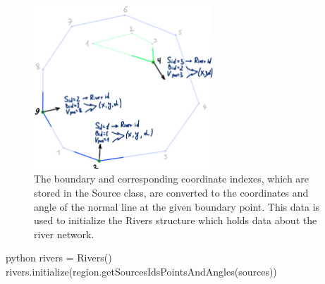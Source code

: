 \documentclass[]{pracamgr}
\begin{document}
      \begin{figure}[H]
        \centering
        \includegraphics[width=0.6\textwidth]{figs/rivers_initialization.png}        
        \caption{The boundary and corresponding coordinate indexes, which are stored in the Source class, are converted to the coordinates and angle of the normal line at the given boundary point. This data is used to initialize the Rivers structure which holds data about the river network.}
        \label{rivers_initialization}
      \end{figure}

      \begin{mintedbox}{python}
        rivers = Rivers()
        rivers.initialize(region.getSourcesIdsPointsAndAngles(sources))\end{mintedbox}
      
\end{document}
